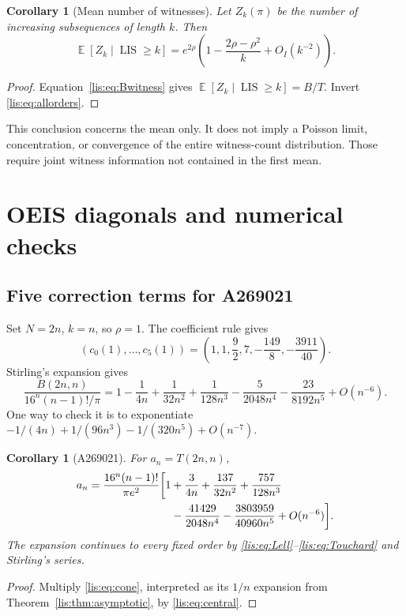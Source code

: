 \documentclass[11pt,letterpaper]{article}
\numberwithin{equation}{section}
\newtheorem{corollary}[theorem]{Corollary}
\theoremstyle{definition}
\DeclareMathOperator{\LIS}{LIS}
\DeclareMathOperator{\E}{\mathbb E}
\begin{document}
\begin{corollary}[Mean number of witnesses]\label{lis:cor:witnesses}
Let $Z_k(\pi)$ be the number of increasing subsequences of length $k$.
Then
\begin{equation}
 \E[Z_k\mid\LIS\ge k]
 =e^{2\rho}\left(1-\frac{2\rho-\rho^2}{k}
                         +O_I(k^{-2})\right).
 \label{lis:eq:witnessmean}
\end{equation}
\end{corollary}
\begin{proof}
Equation~\eqref{lis:eq:Bwitness} gives
$\E[Z_k\mid\LIS\ge k]=B/T$. Invert \eqref{lis:eq:allorders}.
\end{proof}

This conclusion concerns the mean only. It does not imply a Poisson
limit, concentration, or convergence of the entire witness-count
distribution. Those require joint witness information not contained in
the first mean.

\section{OEIS diagonals and numerical checks}
\subsection{Five correction terms for A269021}
Set $N=2n$, $k=n$, so $\rho=1$. The coefficient rule gives
\begin{equation}
 (c_0(1),\ldots,c_5(1))
 =\left(1,1,\frac92,7,-\frac{149}{8},-\frac{3911}{40}\right).
 \label{lis:eq:cone}
\end{equation}
Stirling's expansion gives
\begin{equation}
 \frac{B(2n,n)}{16^n(n-1)!/\pi}
 =1-\frac1{4n}+\frac1{32n^2}+\frac1{128n^3}
       -\frac5{2048n^4}-\frac{23}{8192n^5}+O(n^{-6}).
 \label{lis:eq:central}
\end{equation}
One way to check it is to exponentiate
$-1/(4n)+1/(96n^3)-1/(320n^5)+O(n^{-7})$.

\begin{corollary}[A269021]\label{lis:cor:269}
For $a_n=T(2n,n)$,
\begin{align}
 a_n=\frac{16^n(n-1)!}{\pi e^2}\bigg[1
 &+\frac{3}{4n}+\frac{137}{32n^2}+\frac{757}{128n^3}\notag\\
 &-\frac{41429}{2048n^4}
       -\frac{3803959}{40960n^5}+O(n^{-6})\bigg].
 \label{lis:eq:269asymptotic}
\end{align}
The expansion continues to every fixed order by
\eqref{lis:eq:Lell}--\eqref{lis:eq:Touchard} and Stirling's series.
\end{corollary}
\begin{proof}
Multiply \eqref{lis:eq:cone}, interpreted as its $1/n$ expansion from
Theorem~\ref{lis:thm:asymptotic}, by \eqref{lis:eq:central}.
\end{proof}
\end{document}
